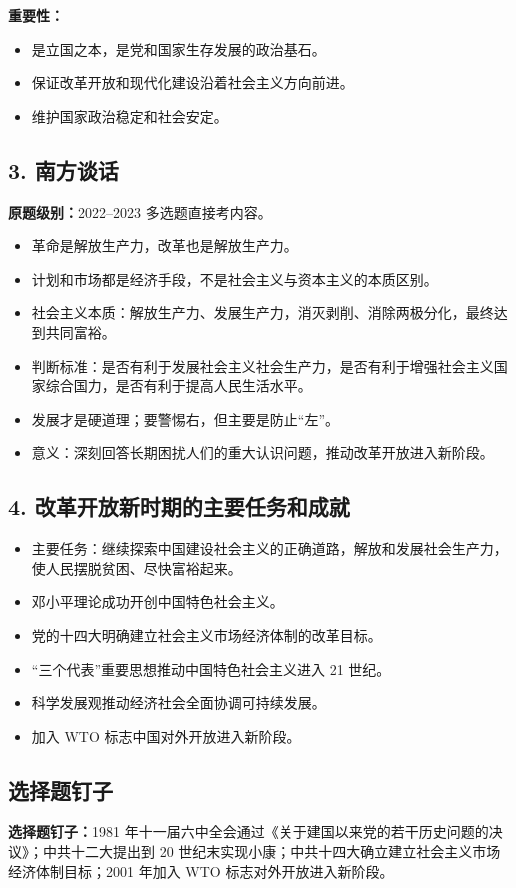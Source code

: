 \documentclass[UTF8,zihao=-4]{ctexart}
\newcommand{\exam}[1]{\textcolor{accent}{\bfseries 原题级别：}#1}
\newcommand{\pin}[1]{\textcolor{main}{\bfseries 选择题钉子：}#1}
\begin{document}
\textbf{重要性：}
\begin{itemize}
  \item 是立国之本，是党和国家生存发展的政治基石。
  \item 保证改革开放和现代化建设沿着社会主义方向前进。
  \item 维护国家政治稳定和社会安定。
\end{itemize}

\subsection{3. 南方谈话}
\exam{2022--2023 多选题直接考内容。}
\begin{itemize}
  \item 革命是解放生产力，改革也是解放生产力。
  \item 计划和市场都是经济手段，不是社会主义与资本主义的本质区别。
  \item 社会主义本质：解放生产力、发展生产力，消灭剥削、消除两极分化，最终达到共同富裕。
  \item 判断标准：是否有利于发展社会主义社会生产力，是否有利于增强社会主义国家综合国力，是否有利于提高人民生活水平。
  \item 发展才是硬道理；要警惕右，但主要是防止“左”。
  \item 意义：深刻回答长期困扰人们的重大认识问题，推动改革开放进入新阶段。
\end{itemize}

\subsection{4. 改革开放新时期的主要任务和成就}
\begin{itemize}
  \item 主要任务：继续探索中国建设社会主义的正确道路，解放和发展社会生产力，使人民摆脱贫困、尽快富裕起来。
  \item 邓小平理论成功开创中国特色社会主义。
  \item 党的十四大明确建立社会主义市场经济体制的改革目标。
  \item “三个代表”重要思想推动中国特色社会主义进入 21 世纪。
  \item 科学发展观推动经济社会全面协调可持续发展。
  \item 加入 WTO 标志中国对外开放进入新阶段。
\end{itemize}

\subsection{选择题钉子}
\pin{1981 年十一届六中全会通过《关于建国以来党的若干历史问题的决议》；中共十二大提出到 20 世纪末实现小康；中共十四大确立建立社会主义市场经济体制目标；2001 年加入 WTO 标志对外开放进入新阶段。}
\end{document}
